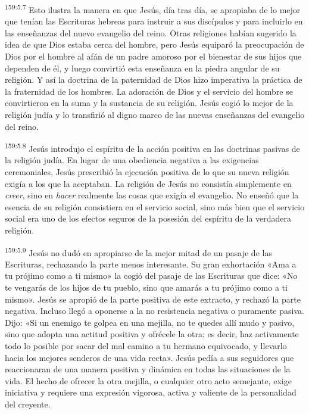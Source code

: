 \par 
\textsuperscript{159:5.7} Esto ilustra la manera en que Jesús, día tras día, se apropiaba de lo mejor que tenían las Escrituras hebreas para instruir a sus discípulos y para incluirlo en las enseñanzas del nuevo evangelio del reino. Otras religiones habían sugerido la idea de que Dios estaba cerca del hombre, pero Jesús equiparó la preocupación de Dios por el hombre al afán de un padre amoroso por el bienestar de sus hijos que dependen de él, y luego convirtió esta enseñanza en la piedra angular de su religión. Y así la doctrina de la paternidad de Dios hizo imperativa la práctica de la fraternidad de los hombres. La adoración de Dios y el servicio del hombre se convirtieron en la suma y la sustancia de su religión. Jesús cogió lo mejor de la religión judía y lo transfirió al digno marco de las nuevas enseñanzas del evangelio del reino.

\par 
\textsuperscript{159:5.8} Jesús introdujo el espíritu de la acción positiva en las doctrinas pasivas de la religión judía. En lugar de una obediencia negativa a las exigencias ceremoniales, Jesús prescribió la ejecución positiva de lo que su nueva religión exigía a los que la aceptaban. La religión de Jesús no consistía simplemente en \textit{creer}, sino en \textit{hacer} realmente las cosas que exigía el evangelio. No enseñó que la esencia de su religión consistiera en el servicio social, sino más bien que el servicio social era uno de los efectos seguros de la posesión del espíritu de la verdadera religión.

\par 
\textsuperscript{159:5.9} Jesús no dudó en apropiarse de la mejor mitad de un pasaje de las Escrituras, rechazando la parte menos interesante. Su gran exhortación «Ama a tu prójimo como a ti mismo» la cogió del pasaje de las Escrituras que dice: «No te vengarás de los hijos de tu pueblo, sino que amarás a tu prójimo como a ti mismo». Jesús se apropió de la parte positiva de este extracto, y rechazó la parte negativa. Incluso llegó a oponerse a la no resistencia negativa o puramente pasiva. Dijo: «Si un enemigo te golpea en una mejilla, no te quedes allí mudo y pasivo, sino que adopta una actitud positiva y ofrécele la otra; es decir, haz activamente todo lo posible por sacar del mal camino a tu hermano equivocado, y llevarlo hacia los mejores senderos de una vida recta». Jesús pedía a sus seguidores que reaccionaran de una manera positiva y dinámica en todas las situaciones de la vida. El hecho de ofrecer la otra mejilla, o cualquier otro acto semejante, exige iniciativa y requiere una expresión vigorosa, activa y valiente de la personalidad del creyente.


